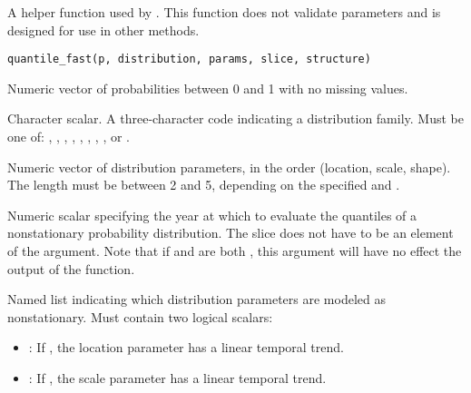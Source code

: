 \documentclass[a4paper]{book}
\begin{document}
%
\begin{Description}
A helper function used by .
This function does not validate parameters and is designed for use in other methods.
\end{Description}
%
\begin{Usage}
\begin{verbatim}
quantile_fast(p, distribution, params, slice, structure)
\end{verbatim}
\end{Usage}
%
\begin{Arguments}
\begin{ldescription}
\item[\code{p}] Numeric vector of probabilities between 0 and 1 with no missing values.

\item[\code{distribution}] Character scalar. A three-character code indicating
a distribution family. Must be one of: , , ,
, , , , , or .

\item[\code{params}] Numeric vector of distribution parameters, in the order (location,
scale, shape). The length must be between 2 and 5, depending on the specified
 and .

\item[\code{slice}] Numeric scalar specifying the year at which to evaluate the
quantiles of a nonstationary probability distribution. The slice does not
have to be an element of the  argument. Note that if 
and  are both , this argument will have no effect the
output of the function.

\item[\code{structure}] Named list indicating which distribution parameters are
modeled as nonstationary. Must contain two logical scalars:
\begin{itemize}

\item{} : If , the location parameter has a linear temporal trend.
\item{} : If , the scale parameter has a linear temporal trend.

\end{itemize}

\end{ldescription}
\end{Arguments}
\end{document}
